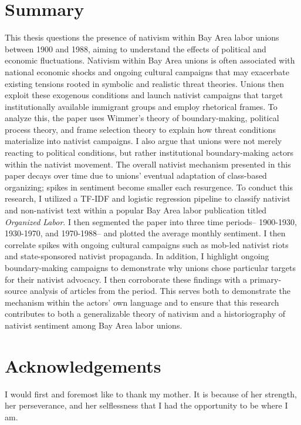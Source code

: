 \documentclass[12pt,a4paper]{article}
\begin{document}
\section*{Summary}

This thesis questions the presence of nativism within Bay Area labor unions between 1900 and 1988, aiming to understand the effects of political and economic fluctuations. Nativism within Bay Area unions is often associated with national economic shocks and ongoing cultural campaigns that may exacerbate existing tensions rooted in symbolic and realistic threat theories. Unions then exploit these exogenous conditions and launch nativist campaigns that target institutionally available immigrant groups and employ rhetorical frames. To analyze this, the paper uses Wimmer’s theory of boundary-making, political process theory, and frame selection theory to explain how threat conditions materialize into nativist campaigns. I also argue that unions were not merely reacting to political conditions, but rather institutional boundary-making actors within the nativist movement. The overall nativist mechanism presented in this paper decays over time due to unions' eventual adaptation of class-based organizing; spikes in sentiment become smaller each resurgence. To conduct this research, I utilized a TF-IDF and logistic regression pipeline to classify nativist and non-nativist text within a popular Bay Area labor publication titled \textit{Organized Labor}. I then segmented the paper into three time periods– 1900-1930, 1930-1970, and 1970-1988– and plotted the average monthly sentiment. I then correlate spikes with ongoing cultural campaigns such as mob-led nativist riots and state-sponsored nativist propaganda. In addition, I highlight ongoing boundary-making campaigns to demonstrate why unions chose particular targets for their nativist advocacy. I then corroborate these findings with a primary-source analysis of articles from the period. This serves both to demonstrate the mechanism within the actors' own language and to ensure that this research contributes to both a generalizable theory of nativism and a historiography of nativist sentiment among Bay Area labor unions.  

\newpage

\section*{Acknowledgements}
I would first and foremost like to thank my mother. It is because of her strength, her perseverance, and her selflessness that I had the opportunity to be where I am.
\end{document}
